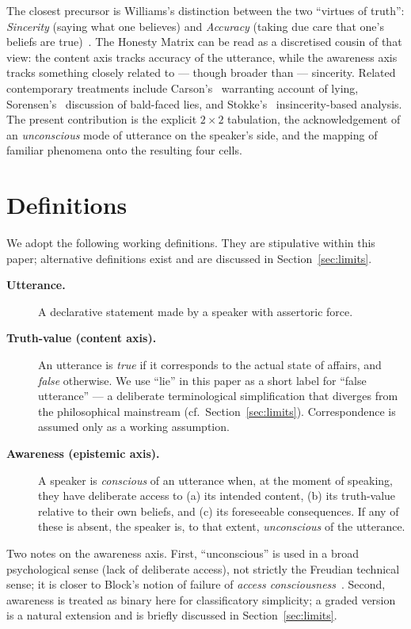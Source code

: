 \documentclass[11pt,a4paper]{article}
\begin{document}
The closest precursor is Williams's distinction between the two
``virtues of truth'': \emph{Sincerity} (saying what one believes) and
\emph{Accuracy} (taking due care that one's beliefs are
true)~\cite{williams2002}. The Honesty Matrix can be read as a
discretised cousin of that view: the content axis tracks accuracy of
the utterance, while the awareness axis tracks something closely
related to --- though broader than --- sincerity. Related contemporary
treatments include Carson's~\cite{carson2010} warranting account of
lying, Sorensen's~\cite{sorensen2007} discussion of bald-faced lies,
and Stokke's~\cite{stokke2018} insincerity-based analysis. The present
contribution is the explicit $2\times 2$ tabulation, the
acknowledgement of an \emph{unconscious} mode of utterance on the
speaker's side, and the mapping of familiar phenomena onto the
resulting four cells.

\section{Definitions}

We adopt the following working definitions. They are stipulative within
this paper; alternative definitions exist and are discussed in
Section~\ref{sec:limits}.

\begin{description}
  \item[\textbf{Utterance.}] A declarative statement made by a speaker
        with assertoric force.
  \item[\textbf{Truth-value (content axis).}] An utterance is
        \emph{true} if it corresponds to the actual state of affairs,
        and \emph{false} otherwise. We use ``lie'' in this paper as a
        short label for ``false utterance'' --- a deliberate
        terminological simplification that diverges from the
        philosophical mainstream (cf.\ Section~\ref{sec:limits}).
        Correspondence is assumed only as a working assumption.
  \item[\textbf{Awareness (epistemic axis).}] A speaker is
        \emph{conscious} of an utterance when, at the moment of
        speaking, they have deliberate access to (a) its intended
        content, (b) its truth-value relative to their own beliefs,
        and (c) its foreseeable consequences. If any of these is
        absent, the speaker is, to that extent, \emph{unconscious} of
        the utterance.
\end{description}

\noindent
Two notes on the awareness axis. First, ``unconscious'' is used in a
broad psychological sense (lack of deliberate access), not strictly the
Freudian technical sense; it is closer to Block's notion of failure of
\emph{access consciousness}~\cite{block1995}. Second, awareness is
treated as binary here for classificatory simplicity; a graded version
is a natural extension and is briefly discussed in
Section~\ref{sec:limits}.
\end{document}
